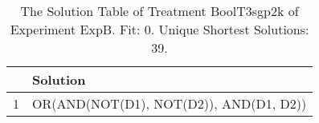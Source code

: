 \begin{table}[ht]
\centering
\begin{tabular}{rp{9cm}}
  \hline
 & Solution \\ 
  \hline
1 & OR(AND(NOT(D1), NOT(D2)), AND(D1, D2)) \\ 
   \hline
\end{tabular}
\caption{The Solution Table of Treatment BoolT3sgp2k of Experiment ExpB. Fit: 0. Unique Shortest Solutions: 39.} 
\end{table}
